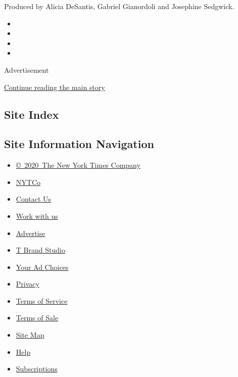 Produced by Alicia DeSantis, Gabriel Gianordoli and Josephine Sedgwick.

\begin{itemize}
\item
\item
\item
\item
\end{itemize}

Advertisement

\protect\hyperlink{after-bottom}{Continue reading the main story}

\hypertarget{site-index}{%
\subsection{Site Index}\label{site-index}}

\hypertarget{site-information-navigation}{%
\subsection{Site Information
Navigation}\label{site-information-navigation}}

\begin{itemize}
\tightlist
\item
  \href{https://help.nytimes3xbfgragh.onion/hc/en-us/articles/115014792127-Copyright-notice}{©~2020~The
  New York Times Company}
\end{itemize}

\begin{itemize}
\tightlist
\item
  \href{https://www.nytco.com/}{NYTCo}
\item
  \href{https://help.nytimes3xbfgragh.onion/hc/en-us/articles/115015385887-Contact-Us}{Contact
  Us}
\item
  \href{https://www.nytco.com/careers/}{Work with us}
\item
  \href{https://nytmediakit.com/}{Advertise}
\item
  \href{http://www.tbrandstudio.com/}{T Brand Studio}
\item
  \href{https://www.nytimes3xbfgragh.onion/privacy/cookie-policy\#how-do-i-manage-trackers}{Your
  Ad Choices}
\item
  \href{https://www.nytimes3xbfgragh.onion/privacy}{Privacy}
\item
  \href{https://help.nytimes3xbfgragh.onion/hc/en-us/articles/115014893428-Terms-of-service}{Terms
  of Service}
\item
  \href{https://help.nytimes3xbfgragh.onion/hc/en-us/articles/115014893968-Terms-of-sale}{Terms
  of Sale}
\item
  \href{https://spiderbites.nytimes3xbfgragh.onion}{Site Map}
\item
  \href{https://help.nytimes3xbfgragh.onion/hc/en-us}{Help}
\item
  \href{https://www.nytimes3xbfgragh.onion/subscription?campaignId=37WXW}{Subscriptions}
\end{itemize}
